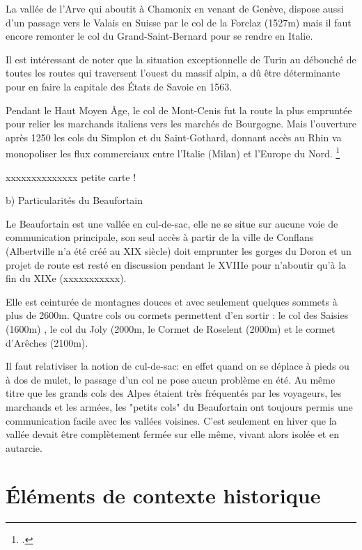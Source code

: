 \documentclass[12pt,a4paper]{report}
\begin{document}
La vallée de l'Arve qui aboutit à Chamonix en venant de Genève, dispose aussi d'un passage vers le Valais en Suisse par le col de la Forclaz (1527m) mais il faut encore remonter le col du Grand-Saint-Bernard pour se rendre en Italie.

Il est intéressant de noter que la situation exceptionnelle de Turin au débouché de toutes les routes qui traversent l'ouest du massif alpin, a dû être déterminante pour en faire la capitale des États de Savoie en 1563.

Pendant le Haut Moyen Âge, le col de Mont-Cenis fut la route la plus empruntée pour relier les marchands italiens vers les marchés de Bourgogne.
Mais l'ouverture  après 1250 les cols du Simplon et du Saint-Gothard, donnant accès au Rhin va monopoliser les flux commerciaux entre l'Italie (Milan) et l'Europe du Nord. \footcite{PRacine2003} 

xxxxxxxxxxxxxx petite carte !

b)	Particularités du Beaufortain

Le Beaufortain est une vallée en cul-de-sac, elle ne se situe sur aucune voie de communication principale,  son seul accès à  partir de la ville de Conflans (Albertville n'a été créé au XIX siècle) doit emprunter les gorges du Doron et un projet de route est resté en discussion pendant le XVIIIe pour n'aboutir qu'à la fin du XIXe (xxxxxxxxxxx).

Elle est ceinturée de montagnes douces et avec seulement quelques sommets à plus de 2600m. Quatre cols ou cormets permettent d'en sortir : le col des Saisies (1600m) , le col du Joly (2000m, le Cormet de Roselent (2000m) et le cormet d'Arêches (2100m).

Il faut relativiser la notion de cul-de-sac: en effet quand on se déplace à pieds ou à dos de mulet, le passage d'un col ne pose aucun problème en été. Au même titre que les grands cols des Alpes étaient très fréquentés par les voyageurs, les marchands et les armées, les "petits cols" du Beaufortain ont toujours permis une communication facile avec les vallées voisines. C'est seulement en hiver que la vallée devait être complètement fermée sur elle même, vivant alors isolée et en autarcie.

\section{Éléments de contexte historique}
\end{document}
